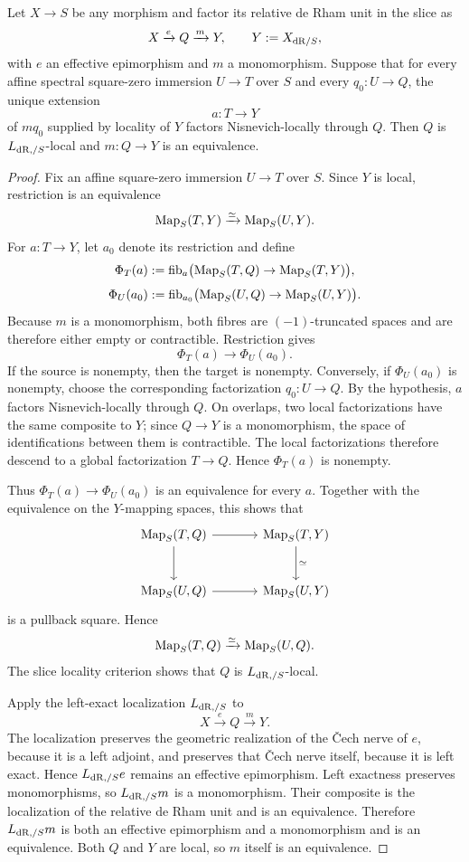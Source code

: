 \begin{lemma}
\label{lem:infinitesimal-image-locality}
Let $X\to S$ be any morphism and factor its relative de Rham unit in the slice
as
\[
    X\xrightarrow{e}Q\xrightarrow{m}Y,
    \qquad
    Y:=X_{\mathrm{dR}/S},
\]
with $e$ an effective epimorphism and $m$ a monomorphism.  Suppose that for
every affine spectral square-zero immersion $U\to T$ over $S$ and every
$q_0:U\to Q$, the unique extension
\[
    a:T\longrightarrow Y
\]
of $mq_0$ supplied by locality of $Y$ factors Nisnevich-locally through $Q$.
Then $Q$ is $L_{\mathrm{dR},/S}$-local and $m:Q\to Y$ is an equivalence.
\end{lemma}

\begin{proof}
Fix an affine square-zero immersion $U\to T$ over $S$.  Since $Y$ is local,
restriction is an equivalence
\[
    \operatorname{Map}_S(T,Y)\xrightarrow{\simeq}\operatorname{Map}_S(U,Y).
\]
For $a:T\to Y$, let $a_0$ denote its restriction and define
\[
    \Phi_T(a)
    :=
    \operatorname{fib}_a\bigl(\operatorname{Map}_S(T,Q)\to\operatorname{Map}_S(T,Y)\bigr),
\]
\[
    \Phi_U(a_0)
    :=
    \operatorname{fib}_{a_0}\bigl(\operatorname{Map}_S(U,Q)\to\operatorname{Map}_S(U,Y)\bigr).
\]
Because $m$ is a monomorphism, both fibres are $(-1)$-truncated spaces and are
therefore either empty or contractible.  Restriction gives
\[
    \Phi_T(a)\longrightarrow\Phi_U(a_0).
\]
If the source is nonempty, then the target is nonempty.  Conversely, if
$\Phi_U(a_0)$ is nonempty, choose the corresponding factorization
$q_0:U\to Q$.  By the hypothesis, $a$ factors Nisnevich-locally through
$Q$.  On overlaps, two local factorizations have the same composite to $Y$;
since $Q\to Y$ is a monomorphism, the space of identifications between them
is contractible.  The local factorizations therefore descend to a global
factorization $T\to Q$.  Hence $\Phi_T(a)$ is nonempty.

Thus $\Phi_T(a)\to\Phi_U(a_0)$ is an equivalence for every $a$.  Together
with the equivalence on the $Y$-mapping spaces, this shows that
\[
\begin{tikzcd}[column sep=large,row sep=large]
    \Map_S(T,Q) \ar[r] \ar[d]
        & \Map_S(T,Y) \ar[d,"\simeq"]\\
    \Map_S(U,Q) \ar[r]
        & \Map_S(U,Y)
\end{tikzcd}
\]
is a pullback square.  Hence
\[
    \operatorname{Map}_S(T,Q)\xrightarrow{\simeq}\operatorname{Map}_S(U,Q).
\]
The slice locality criterion shows that $Q$ is $L_{\mathrm{dR},/S}$-local.

Apply the left-exact localization $L_{\mathrm{dR},/S}$ to
\[
    X\xrightarrow{e}Q\xrightarrow{m}Y.
\]
The localization preserves the geometric realization of the \v{C}ech nerve
of $e$, because it is a left adjoint, and preserves that \v{C}ech nerve
itself, because it is left exact.  Hence $L_{\mathrm{dR},/S}e$ remains an effective
epimorphism.  Left exactness preserves monomorphisms, so
$L_{\mathrm{dR},/S}m$ is a monomorphism.  Their composite is the localization of the
relative de Rham unit and is an equivalence.  Therefore $L_{\mathrm{dR},/S}m$ is both
an effective epimorphism and a monomorphism and is an equivalence.  Both $Q$
and $Y$ are local, so $m$ itself is an equivalence.
\end{proof}

